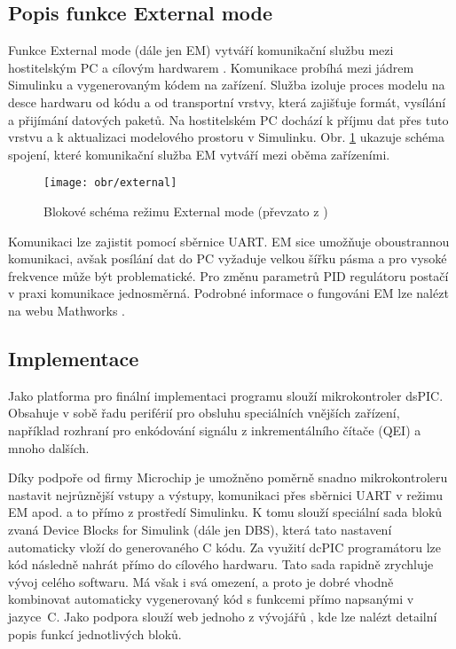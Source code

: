\subsection{Popis funkce External mode}
\label{external}

Funkce External mode (dále jen EM) vytváří komunikační službu mezi hostitelským PC a cílovým hardwarem \cite{external}. Komunikace probíhá mezi jádrem Simulinku a vygenerovaným kódem na zařízení. Služba izoluje proces modelu na desce hardwaru od kódu a od transportní vrstvy, která zajišťuje formát, vysílání a přijímání datových paketů. Na hostitelském PC dochází k příjmu dat přes tuto vrstvu a k aktualizaci modelového prostoru v Simulinku. Obr. \ref{externall} ukazuje schéma spojení, které komunikační služba EM vytváří mezi oběma zařízeními. 
 
\begin{figure}[htb]
\begin{center}
\texttt{[image: obr/external]}
\end{center}
\caption{Blokové schéma režimu External mode (převzato z \cite{external})}
\label{externall}
\end{figure}

Komunikaci lze zajistit pomocí sběrnice UART. EM sice umožňuje oboustrannou komunikaci, avšak posílání dat do PC vyžaduje velkou šířku pásma a pro vysoké frekvence může být problematické. Pro změnu parametrů PID regulátoru postačí v praxi komunikace jednosměrná. Podrobné informace o fungováni EM lze nalézt na webu Mathworks \cite{external}.

\subsection{Implementace}
\label{implementacee}

Jako platforma pro finální implementaci programu slouží mikrokontroler dsPIC. Obsahuje v sobě řadu periférií pro obsluhu speciálních vnějších zařízení, například rozhraní pro enkódování signálu z inkrementálního čítače (QEI) a mnoho dalších.

Díky podpoře od firmy Microchip je umožněno poměrně snadno  mikrokontroleru nastavit nejrůznější vstupy a výstupy, komunikaci přes sběrnici UART v režimu EM apod. a to přímo z prostředí Simulinku. K tomu slouží speciální sada bloků zvaná Device Blocks for Simulink (dále jen DBS), která tato nastavení automaticky vloží do generovaného C kódu. Za využití dcPIC programátoru lze kód následně nahrát přímo do cílového hardwaru. 	
Tato sada rapidně zrychluje vývoj celého softwaru. Má však i svá omezení, a proto je dobré vhodně kombinovat automaticky vygenerovaný kód s funkcemi přímo napsanými v jazyce~C. Jako podpora slouží web jednoho z vývojářů \cite{lubin}, kde lze nalézt detailní popis funkcí jednotlivých bloků.


